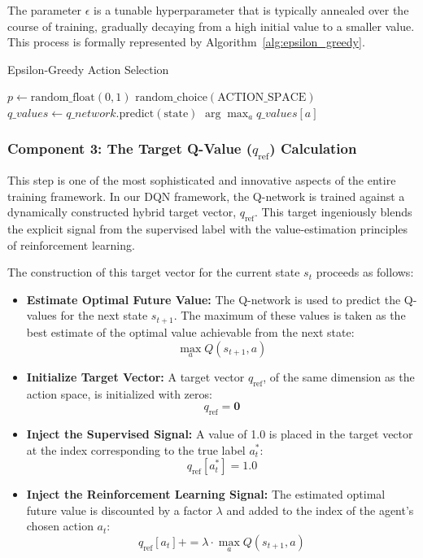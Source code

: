 \documentclass[16pt]{report}
\begin{document}
The parameter $\epsilon$ is a tunable hyperparameter that is typically annealed over the course of training, gradually decaying from a high initial value to a smaller value. This process is formally represented by Algorithm~\ref{alg:epsilon_greedy}.

\begin{algorithm}[H]
\caption{Epsilon-Greedy Action Selection}
\label{alg:epsilon_greedy}
\begin{algorithmic}[1]
    \State $p \gets \text{random\_float}(0, 1)$
        \State \Return $\text{random\_choice}(\text{ACTION\_SPACE})$
    \Else
        \State $q\_values \gets q\_network.\text{predict}(\text{state})$
        \State \Return $\arg\max_a q\_values[a]$
    \EndIf
\EndFunction
\end{algorithmic}
\end{algorithm}

\subsubsection{Component 3: The Target Q-Value ($q_\text{ref}$) Calculation}

This step is one of the most sophisticated and innovative aspects of the entire training framework. In our DQN framework, the Q-network is trained against a dynamically constructed hybrid target vector, $q_\text{ref}$. This target ingeniously blends the explicit signal from the supervised label with the value-estimation principles of reinforcement learning.

The construction of this target vector for the current state $s_t$ proceeds as follows:

\begin{itemize}
    \item \textbf{Estimate Optimal Future Value:} The Q-network is used to predict the Q-values for the next state $s_{t+1}$. The maximum of these values is taken as the best estimate of the optimal value achievable from the next state:
    \[
    \max_a Q(s_{t+1}, a)
    \]
    
    \item \textbf{Initialize Target Vector:} A target vector $q_\text{ref}$, of the same dimension as the action space, is initialized with zeros:
    \[
    q_\text{ref} = \mathbf{0}
    \]

    \item \textbf{Inject the Supervised Signal:} A value of 1.0 is placed in the target vector at the index corresponding to the true label $a_t^*$:
    \[
    q_\text{ref}[a_t^*] = 1.0
    \]

    \item \textbf{Inject the Reinforcement Learning Signal:} The estimated optimal future value is discounted by a factor $\lambda$ and added to the index of the agent’s chosen action $a_t$:
    \[
    q_\text{ref}[a_t] += \lambda \cdot \max_a Q(s_{t+1}, a)
    \]
\end{itemize}
\end{document}
